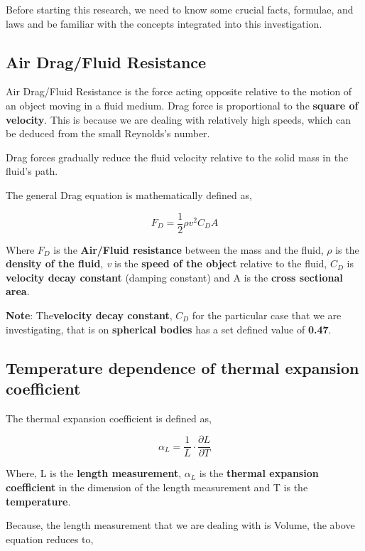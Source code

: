 {Before starting this research, we need to know some crucial facts, formulae, and laws and be familiar with the concepts integrated into this investigation.}
        
\subsection{{Air Drag/Fluid Resistance}}
        
    {Air Drag/Fluid Resistance is the force acting opposite relative to the motion of an object moving in a fluid medium. Drag force is proportional to the \textbf{square of velocity}. This is because we are dealing with relatively high speeds, which can be deduced from the small Reynolds's number.}
            
    {Drag forces gradually reduce the fluid velocity relative to the solid mass in the fluid's path.}
            
    {The general Drag equation is mathematically defined as,}
            
        $$F_D = \frac{1}{2}\rho v^2C_DA$$
           
    {Where $F_D$ is the \textbf{Air/Fluid resistance} between the mass and the fluid, $\rho$ is the \textbf{density of the fluid}, \textit{v} is the \textbf{speed of the object} relative to the fluid, $C_D$ is \textbf{velocity decay constant} (damping constant) and A is the \textbf{cross sectional area}.}
            
    {\textbf{Note}: The\textbf{velocity decay constant}, $C_D$ for the particular case that we are investigating, that is on \textbf{spherical bodies} has a set defined value of \textbf{0.47}.}
            
\subsection{{Temperature dependence of thermal expansion \\ coefficient}}

	{The thermal expansion coefficient is defined as,}
	
		$$\alpha_{L} = \frac{1}{L}\cdot\frac{\partial L}{\partial T}$$
	
	{Where, L is the \textbf{length measurement}, $\alpha_{L}$ is the \textbf{thermal expansion coefficient} in the dimension of the length measurement and T is the \textbf{temperature}.}	
	
	{Because, the length measurement that we are dealing with is Volume, the above equation reduces to,}

